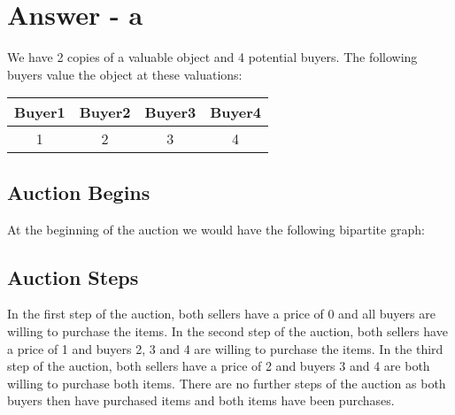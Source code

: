 \documentclass[twoside]{article}
\begin{document}
\section{Answer - a}
We have 2 copies of a valuable object and 4 potential buyers. The following buyers value the object at these valuations:
\begin{center}
 \begin{tabular}{||c c c c||} 
 \hline
 Buyer1 & Buyer2 & Buyer3 & Buyer4 \\ [0.5ex] 
 \hline\hline
 1 & 2 & 3 & 4 \\ 
  \hline\hline
\end{tabular}
\end{center}

\subsection{Auction Begins}
At the beginning of the auction we would have the following bipartite graph:


\subsection{Auction Steps}
In the first step of the auction, both sellers have a price of 0 and all buyers are willing to purchase the items. In the second step of the auction, both sellers have a price of 1 and buyers 2, 3 and 4 are willing to purchase the items. In the third step of the auction, both sellers have a price of 2 and buyers 3 and 4 are both willing to purchase both items. There are no further steps of the auction as both buyers then have purchased items and both items have been purchases.
\end{document}
